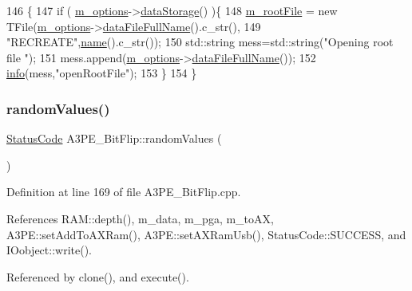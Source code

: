 \begin{DoxyCode}
146                                \{
147   \textcolor{keywordflow}{if} ( \hyperlink{classProcessus_a74205f3c1e00c4448f7b3257c2351797}{m\_options}->\hyperlink{classOptions_aed7799d10139fa542055b982cb820192}{dataStorage}() )\{
148     \hyperlink{classProcessus_a76114f8cf2111e910c323a7ae05a015d}{m\_rootFile} = \textcolor{keyword}{new} TFile(\hyperlink{classProcessus_a74205f3c1e00c4448f7b3257c2351797}{m\_options}->\hyperlink{classOptions_ab1cd9f237e9c18fd72323c74565453f8}{dataFileFullName}().c\_str(),
149                            \textcolor{stringliteral}{"RECREATE"},\hyperlink{classObject_a300f4c05dd468c7bb8b3c968868443c1}{name}().c\_str());
150         std::string mess=std::string(\textcolor{stringliteral}{"Opening root file "});
151         mess.append(\hyperlink{classProcessus_a74205f3c1e00c4448f7b3257c2351797}{m\_options}->\hyperlink{classOptions_ab1cd9f237e9c18fd72323c74565453f8}{dataFileFullName}());
152         \hyperlink{classObject_a644fd329ea4cb85f54fa6846484b84a8}{info}(mess,\textcolor{stringliteral}{"openRootFile"});
153   \}
154 \}
\end{DoxyCode}
\mbox{\label{classA3PE__BitFlip_a57e668f5be18f8bc53f5c105735646bf}} 
\subsubsection{\texorpdfstring{random\+Values()}{randomValues()}}
{\footnotesize\ttfamily \hyperlink{classStatusCode}{Status\+Code} A3\+P\+E\+\_\+\+Bit\+Flip\+::random\+Values (\begin{DoxyParamCaption}{ }\end{DoxyParamCaption})\hspace{0.3cm}{\ttfamily [protected]}}



Definition at line 169 of file A3\+P\+E\+\_\+\+Bit\+Flip.\+cpp.



References R\+A\+M\+::depth(), m\+\_\+data, m\+\_\+pga, m\+\_\+to\+AX, A3\+P\+E\+::set\+Add\+To\+A\+X\+Ram(), A3\+P\+E\+::set\+A\+X\+Ram\+Usb(), Status\+Code\+::\+S\+U\+C\+C\+E\+SS, and I\+Oobject\+::write().



Referenced by clone(), and execute().


